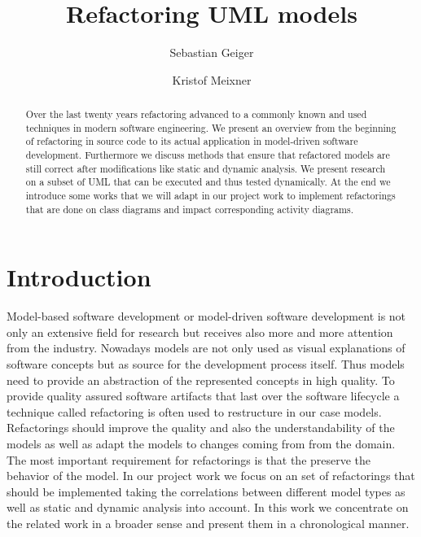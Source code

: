 \documentclass{llncs}
\begin{document}
\pagestyle{plain}

\title{Refactoring UML models}
\author{Sebastian Geiger \and Kristof Meixner}

\maketitle

\begin{abstract}
Over the last twenty years refactoring advanced to a commonly known and used techniques in modern software engineering. We present an overview from the beginning of refactoring in source code to its actual application in model-driven software development. Furthermore we discuss methods that ensure that refactored models are still correct after modifications like static and dynamic analysis. We present research on a subset of UML that can be executed and thus tested dynamically. At the end we introduce some works that we will adapt in our project work to implement refactorings that are done on class diagrams and impact corresponding activity diagrams.
\end{abstract}

\tableofcontents
\newpage


\section{Introduction}
\label{sec:intro}

Model-based software development or model-driven software development is not only an extensive field for research but receives also more and more attention from the industry. Nowadays models are not only used as visual explanations of software concepts but as source for the development process itself. Thus models need to provide an abstraction of
the represented concepts in high quality. To provide quality assured software artifacts that last over the software lifecycle a technique called refactoring is often used to restructure in our case models. Refactorings should improve the quality and also the understandability of the models as well as adapt the models to changes coming from from the domain. The most important requirement for refactorings is that the preserve the behavior of the model. In our project work we focus on an set of refactorings that should be implemented taking the correlations between different model types as well as static and dynamic analysis into account. In this work we concentrate on the related work in a broader sense and present them in a chronological manner.
\end{document}
